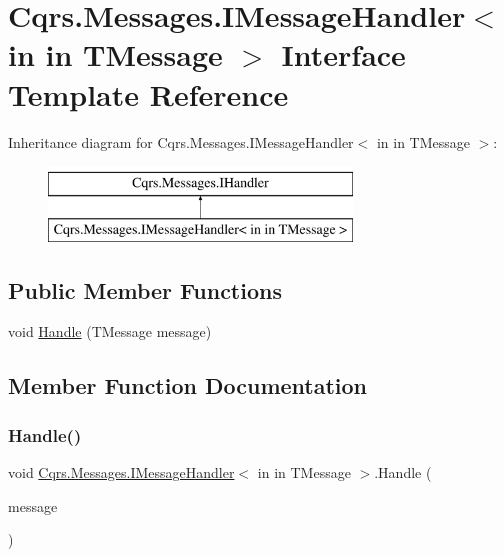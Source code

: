 \hypertarget{interfaceCqrs_1_1Messages_1_1IMessageHandler}{}\section{Cqrs.\+Messages.\+I\+Message\+Handler$<$ in in T\+Message $>$ Interface Template Reference}
\label{interfaceCqrs_1_1Messages_1_1IMessageHandler}
Inheritance diagram for Cqrs.\+Messages.\+I\+Message\+Handler$<$ in in T\+Message $>$\+:\begin{figure}[H]
\begin{center}
\leavevmode
\includegraphics[height=2.000000cm]{interfaceCqrs_1_1Messages_1_1IMessageHandler}
\end{center}
\end{figure}
\subsection*{Public Member Functions}
\begin{DoxyCompactItemize}
\item 
void \hyperlink{interfaceCqrs_1_1Messages_1_1IMessageHandler_a4d68d2c919afce06ce893caabd73f424}{Handle} (T\+Message message)
\end{DoxyCompactItemize}


\subsection{Member Function Documentation}
\mbox{\label{interfaceCqrs_1_1Messages_1_1IMessageHandler_a4d68d2c919afce06ce893caabd73f424}} 
\subsubsection{\texorpdfstring{Handle()}{Handle()}}
{\footnotesize\ttfamily void \hyperlink{interfaceCqrs_1_1Messages_1_1IMessageHandler}{Cqrs.\+Messages.\+I\+Message\+Handler}$<$ in in T\+Message $>$.Handle (\begin{DoxyParamCaption}\item[{T\+Message}]{message }\end{DoxyParamCaption})}

